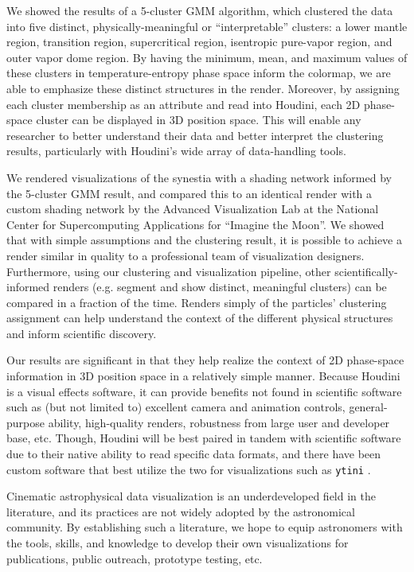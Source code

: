 \documentclass[fleqn,usenatbib,useAMS]{mnras}
\begin{document}
We showed the results of a 5-cluster GMM algorithm, which clustered the data into five distinct, physically-meaningful or ``interpretable'' clusters: a lower mantle region, transition region, supercritical region, isentropic pure-vapor region, and outer vapor dome region. By having the minimum, mean, and maximum values of these clusters in temperature-entropy phase space inform the colormap, we are able to emphasize these distinct structures in the render. Moreover, by assigning each cluster membership as an attribute and read into Houdini, each 2D phase-space cluster can be displayed in 3D position space. This will enable any researcher to better understand their data and better interpret the clustering results, particularly with Houdini's wide array of data-handling tools. \par

We rendered visualizations of the synestia with a shading network informed by the 5-cluster GMM result, and compared this to an identical render with a custom shading network by the Advanced Visualization Lab at the National Center for Supercomputing Applications for ``Imagine the Moon''. We showed that with simple assumptions and the clustering result, it is possible to achieve a render similar in quality to a professional team of visualization designers. Furthermore, using our clustering and visualization pipeline, other scientifically-informed renders (e.g. segment and show distinct, meaningful clusters) can be compared in a fraction of the time. Renders simply of the particles' clustering assignment can help understand the context of the different physical structures and inform scientific discovery. \par

Our results are significant in that they help realize the context of 2D phase-space information in 3D position space in a relatively simple manner. Because Houdini is a visual effects software, it can provide benefits not found in scientific software such as (but not limited to) excellent camera and animation controls, general-purpose ability, high-quality renders, robustness from large user and developer base, etc. Though, Houdini will be best paired in tandem with scientific software due to their native ability to read specific data formats, and there have been custom software that best utilize the two for visualizations such as \texttt{ytini} \citep{Naiman17}.

Cinematic astrophysical data visualization is an underdeveloped field in the literature, and its practices are not widely adopted by the astronomical community. By establishing such a literature, we hope to equip astronomers with the tools, skills, and knowledge to develop their own visualizations for publications, public outreach, prototype testing, etc.  \par
\end{document}
